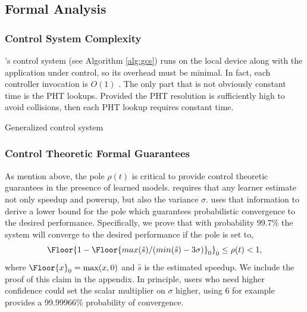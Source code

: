 \subsection{Formal Analysis}
\subsubsection{Control System Complexity}

\SYSTEM{}'s control system (see Algorithm \ref{alg:gcs}) runs on the
local device along with the application under control, so its overhead
must be minimal.  In fact, each controller invocation is $O(1)$ .  The
only part that is not obviously constant time is the PHT lookups.
Provided the PHT resolution is sufficiently high to avoid collisions,
then each PHT lookup requires constant time.
\begin{algorithm}[t]
\caption{Generalized control system}
\label{alg:gcs}
\end{algorithm}

\subsubsection{Control Theoretic Formal Guarantees}
\label{sec:guarantees}
As mention above, the pole $\rho(t)$ is critical to provide control
theoretic guarantees in the presence of learned models.  \SYSTEM{}
requires that any learner estimate not only speedup and powerup, but
also the variance $\sigma$.  \SYSTEM{} uses that information to derive
a lower bound for the pole which guarantees probabilistic convergence
to the desired performance. Specifically, we prove that with
probability 99.7\% the system will converge to the desired performance
if the pole is set to,
$$\Floor{1- \Floor{max(\hat{s})/(min(\hat{s}) - 3\sigma)}_0}_0 \leq \rho(t)
< 1,$$ where $\Floor{x}_0 = \max(x,0)$ and $\hat{s}$ is the
estimated speedup. We include the proof of this claim in the appendix. In principle, users who need higher confidence
could set the scalar multiplier on $\sigma$ higher, using $6$ for
example provides a 99.99966\% probability of convergence.  

